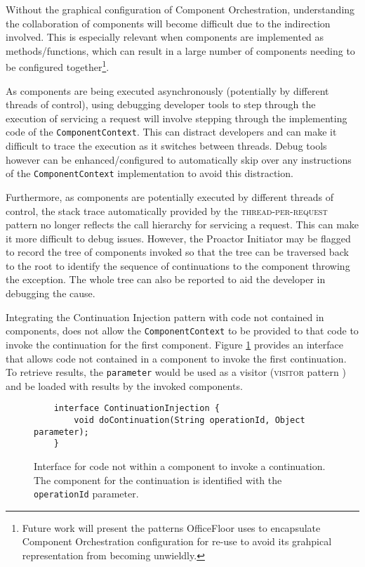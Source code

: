 \documentclass[prodmode]{style/acmlarge}
\begin{document}
Without the graphical configuration of Component Orchestration, understanding
the collaboration of components will become difficult due to the indirection
involved.  This is especially relevant when components are implemented as
methods/functions, which can result in a large number of components needing to
be configured together\footnote{Future work will present the patterns
OfficeFloor \cite{officefloor} uses to encapsulate Component Orchestration
configuration for re-use to avoid its grahpical representation from becoming
unwieldly.}.

As components are being executed asynchronously (potentially by different
threads of control), using debugging developer tools to step through the
execution of servicing a request will involve stepping through the implementing
code of the \texttt{ComponentContext}.  This can distract developers and can
make it difficult to trace the execution as it switches between threads. 
Debug tools however can be enhanced/configured to automatically skip over any
instructions of the \texttt{ComponentContext} implementation to avoid this
distraction.

Furthermore, as components are potentially executed by different threads of
control, the stack trace automatically provided by the
\textsc{thread-per-request} pattern no longer reflects the call hierarchy for
servicing a request.  This can make it more difficult to debug issues.  However,
the Proactor Initiator may be flagged to record the tree of components invoked
so that the tree can be traversed back to the root to identify the sequence of
continuations to the component throwing the exception.  The whole tree can also
be reported to aid the developer in debugging the cause.

Integrating the Continuation Injection pattern with code not contained in
components, does not allow the \texttt{ComponentContext} to be provided to that
code to invoke the continuation for the first component.  Figure
\ref{fig:ContinuationInjectionInterface} provides an interface that allows code
not contained in a component to invoke the first continuation.  To retrieve
results, the \texttt{parameter} would be used as a visitor (\textsc{visitor}
pattern \cite{gof}) and be loaded with results by the invoked components.

\begin{figure}[tp]
\begin{verbatim}
    interface ContinuationInjection {
        void doContinuation(String operationId, Object parameter);
    }
\end{verbatim}
\caption{Interface for code not within a component to invoke a continuation.  The component for the continuation is identified with the \texttt{operationId} parameter.}
\label{fig:ContinuationInjectionInterface}
\end{figure}
\end{document}
